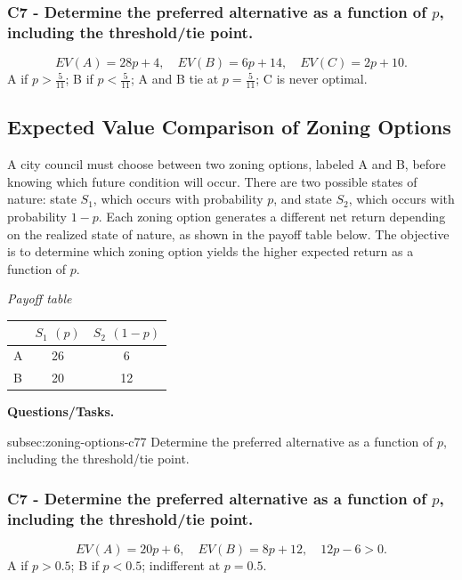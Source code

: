 \subsubsection*{C7 - Determine the preferred alternative as a function of $p$, including the threshold/tie point.}
\label{subsec:production-plans-c7}

\[
    EV(A)=28p+4,\quad EV(B)=6p+14,\quad EV(C)=2p+10.
\]
A if $p>\frac{5}{11}$; B if $p<\frac{5}{11}$; A and B tie at $p=\frac{5}{11}$; C is never optimal.


\subsection{Expected Value Comparison of Zoning Options}
\label{sec:zoning-options}
    A city council must choose between two zoning options, labeled A and B, before knowing which future condition will occur.
    There are two possible states of nature: state $S_1$, which occurs with probability $p$, and state $S_2$, which occurs with probability $1-p$.
    Each zoning option generates a different net return depending on the realized state of nature, as shown in the payoff table below.
    The objective is to determine which zoning option yields the higher expected return as a function of $p$.

    \begin{center}
        \textit{Payoff table} \\
        \begin{tabular}{l c c}
            \toprule
            & $S_1$ $(p)$ & $S_2$ $(1-p)$ \\
            \midrule
            A & 26 & 6 \\
            B & 20 & 12 \\
            \bottomrule
        \end{tabular}
    \end{center}

    \textbf{Questions/Tasks.}
\begin{enumerate}
    \CriterionTask
    {subsec:zoning-options-c7}{7}
    {Determine the preferred alternative as a function of $p$, including the threshold/tie point.}
\end{enumerate}

\subsubsection*{C7 - Determine the preferred alternative as a function of $p$, including the threshold/tie point.}
\label{subsec:zoning-options-c7}

\[
    EV(A)=20p+6,\quad EV(B)=8p+12,\quad 12p-6>0.
\]
A if $p>0.5$; B if $p<0.5$; indifferent at $p=0.5$.



